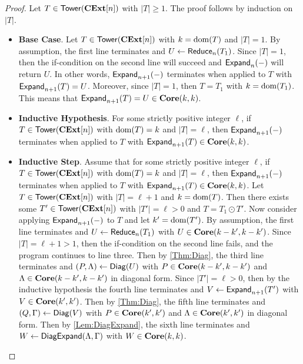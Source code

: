 \begin{proof}
    Let $T \in \mathsf{Tower}( \mathbf{CExt}[n] )$ with $|T| \ge 1$.
    The proof follows by induction on $|T|$.
    \begin{itemize}
    \item \textbf{Base Case}.
          Let $T \in \mathsf{Tower}( \mathbf{CExt}[n] )$ with $k = \operatorname{dom}( T )$ and $|T| = 1$.
          By assumption, the first line terminates and $U \gets \mathsf{Reduce}_n( T_1 )$.
          Since $|T| = 1$, then the if-condition on the second line will succeed and $\mathsf{Expand}_n( - )$ will return $U$.
          In other words, $\mathsf{Expand}_{n+1}( - )$ terminates when applied to $T$ with $\mathsf{Expand}_{n+1}( T ) = U$.
          Moreover, since $|T| = 1$, then $T = T_1$ with $k = \operatorname{dom}( T_1 )$.
          This means that $\mathsf{Expand}_{n+1}( T ) = U \in \mathbf{Core}( k, k )$.
    \item \textbf{Inductive Hypothesis}.
          For some strictly positive integer $\ell$, if $T \in \mathsf{Tower}( \mathbf{CExt}[n] )$ with $\operatorname{dom}( T ) = k$ and $|T| = \ell$, then $\mathsf{Expand}_{n+1}( - )$ terminates when applied to $T$ with $\mathsf{Expand}_{n+1}( T ) \in \mathbf{Core}( k, k )$.
    \item \textbf{Inductive Step}.
          Assume that for some strictly positive integer $\ell$, if $T \in \mathsf{Tower}( \mathbf{CExt}[n] )$ with $\operatorname{dom}( T ) = k$ and $|T| = \ell$, then $\mathsf{Expand}_{n+1}( - )$ terminates when applied to $T$ with $\mathsf{Expand}_{n+1}( T ) \in \mathbf{Core}( k, k )$.
          Let $T \in \mathsf{Tower}( \mathbf{CExt}[n] )$ with $|T| = \ell + 1$ and $k = \operatorname{dom}( T )$.
          Then there exists some $T' \in \mathsf{Tower}( \mathbf{CExt}[n] )$ with $|T'| = \ell > 0$ and $T = T_1 \odot T'$.
          Now consider applying $\mathsf{Expand}_{n+1}( - )$ to $T$ and let $k' = \operatorname{dom}( T' )$.
          By assumption, the first line terminates and $U \gets \mathsf{Reduce}_n( T_1 )$ with $U \in \mathbf{Core}( k - k', k - k' )$.
          Since $|T| = \ell + 1 > 1$, then the if-condition on the second line fails, and the program continues to line three. 
          Then by \cref{Thm:Diag}, the third line terminates and $( P, \Lambda ) \gets \mathsf{Diag}( U )$ with $P \in \mathbf{Core}( k - k', k - k' )$ and $\Lambda \in \mathbf{Core}( k - k', k - k' )$ in diagonal form.
          Since $|T'| = \ell > 0$, then by the inductive hypothesis the fourth line terminates and $V \gets \mathsf{Expand}_{n+1}( T' )$ with $V \in \mathbf{Core}( k', k' )$.
          Then by \cref{Thm:Diag}, the fifth line terminates and $( Q, \Gamma ) \gets \mathsf{Diag}( V )$ with $P \in \mathbf{Core}( k', k' )$ and $\Lambda \in \mathbf{Core}( k', k' )$ in diagonal form.
          Then by \cref{Lem:DiagExpand}, the sixth line terminates and $W \gets \mathsf{DiagExpand}( \Lambda, \Gamma )$ with $W \in \mathbf{Core}( k, k )$.

\end{itemize}
\end{proof}
